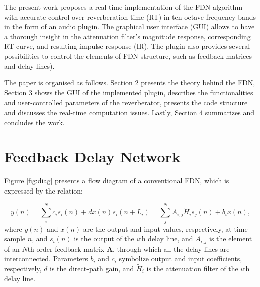 \documentclass[twoside,a4paper]{article}
\newcommand{\silvin}[1]{\textcolor{ForestGreen}{#1}}
\begin{document}




The present work proposes a real-time implementation of the FDN algorithm with accurate control over reverberation time (RT) in ten octave frequency bands in the form of an audio plugin. The graphical user interface (GUI) allows to have a thorough insight in the attenuation filter's magnitude response, corresponding RT curve, and resulting impulse response (IR). The plugin also provides several possibilities to control the elements of FDN structure, such as feedback matrices and delay lines).%

The paper is organised as follows. Section 2 presents the theory behind the FDN, Section 3 shows the GUI of the implemented plugin, describes the functionalities and user-controlled parameters of the reverberator, presents the code structure and discusses the real-time computation issues. Lastly, Section 4 summarizes and concludes the work.




\section{Feedback Delay Network}\label{sec:FDN}
Figure \ref{fig:diag} presents a flow diagram of a conventional FDN, which is expressed by the relation:

\begin{subequations} \label{1}
\begin{equation}\label{1a}
y(n) =  \sum_i^N c_i s_i(n) + d x(n) 
\end{equation}
\begin{equation}\label{1b}
s_i(n + L_i) = \sum_j^N A_{i,j} \widetilde{H}_{i} s_j(n) + b_i x(n),
\end{equation}
\end{subequations}
%
where $y(n)$ and $x(n)$ are the output and input values, respectively, at time sample $n$, and $s_i(n)$ is the output of the $i$th delay line, and $A_{i,j}$ is the element of an $N$th-order feedback matrix $\textbf{A}$, through which all the delay lines are interconnected. Parameters $b_i$ and $c_i$ symbolize output and input coefficients, respectively, $d$ is the direct-path gain, and $\widetilde{H}_{i}$ is the attenuation filter of the $i$th delay line.
\end{document}
